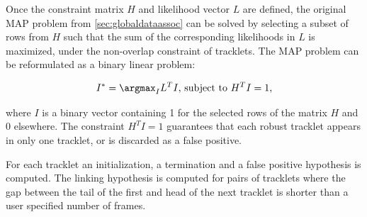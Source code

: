 		Once the constraint matrix $H$ and likelihood vector $L$ are defined, the original MAP problem from \cref{sec:globaldataassoc} can be solved by selecting a subset of rows from $H$ such that the sum of the corresponding likelihoods in $L$ is maximized, under the non-overlap constraint of tracklets. The MAP problem can be reformulated as a binary linear problem:
		
		\[
			I^* = \argmax_I L^T I \text{,    subject to } H^T I = 1 \text{,}
		\]
		
		\noindent where $I$ is a binary vector containing 1 for the selected rows of the matrix $H$ and 0 elsewhere. The constraint $H^T I = 1$ guarantees that each robust tracklet appears in only one tracklet, or is discarded as a false positive.
	 
		For each tracklet an initialization, a termination and a false positive hypothesis is computed. The linking hypothesis is computed for pairs of tracklets where the gap between the tail of the first and head of the next tracklet is shorter than a user specified number of frames.
	 	        		
